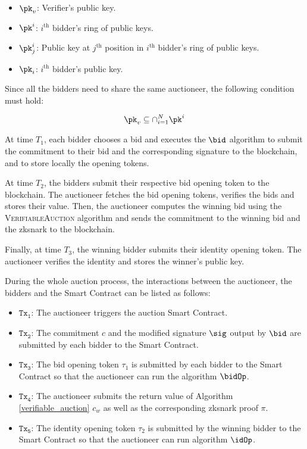 \begin{itemize}
    \item $\pk_v$: Verifier's public key.
    \item $\pk^i$: $i^{\text{th}}$ bidder's ring of public keys.
    \item $\pk^i_j$: Public key at $j^{\text{th}}$ position in $i^{\text{th}}$ bidder's ring of public keys.
    \item $\pk_i$: $i^{\text{th}}$ bidder's public key.
\end{itemize}

Since all the bidders need to share the same auctioneer, the following condition must hold:

\begin{equation*}
    \pk_v \subseteq \cap_{i=1}^N \pk^i
\end{equation*}

At time $T_1$, each bidder chooses a bid and executes the $\bid$ algorithm to submit the commitment to their bid and the corresponding signature to the blockchain, and to store locally the opening tokens.

At time $T_2$, the bidders submit their respective bid opening token to the blockchain. The auctioneer fetches the bid opening tokens, verifies the bids and stores their value. Then, the auctioneer computes the winning bid using the \textsc{VerifiableAuction} algorithm and sends the commitment to the winning bid and the \gls{zksnark} to the blockchain.

Finally, at time $T_3$, the winning bidder submits their identity opening token. The auctioneer verifies the identity and stores the winner's public key.

During the whole auction process, the interactions between the auctioneer, the bidders and the Smart Contract can be listed as follows:
\begin{itemize}
\item $\mathtt{Tx_1}$: The auctioneer triggers the auction Smart Contract.
\item $\mathtt{Tx_2}$: The commitment $c$ and the modified signature $\sig$ output by $\bid$ are submitted by each bidder to the Smart Contract.
\item $\mathtt{Tx_3}$: The bid opening token $\tau_1$ is submitted by each bidder to the Smart Contract so that the auctioneer can run the algorithm $\bidOp$.
\item $\mathtt{Tx_4}$: The auctioneer submits the return value of Algorithm \ref{verifiable_auction} $c_w$ as well as the corresponding \gls{zksnark} proof $\pi$.
\item $\mathtt{Tx_5}$: The identity opening token $\tau_2$ is submitted by the winning bidder to the Smart Contract so that the auctioneer can run algorithm $\idOp$.
\end{itemize}
